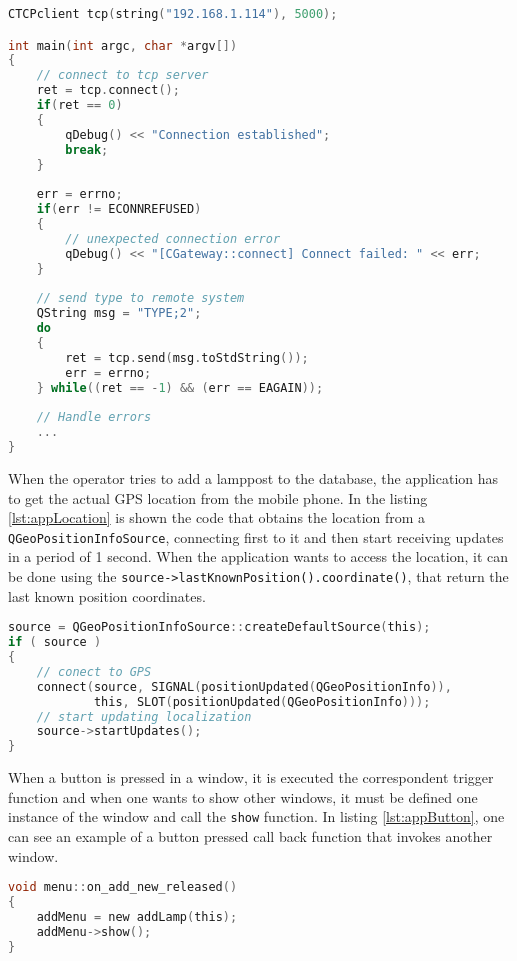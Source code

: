 \begin{lstlisting}[language=C, caption={Mobile Application: Connection to the server.}, label={lst:appConnection}]
CTCPclient tcp(string("192.168.1.114"), 5000);

int main(int argc, char *argv[])
{
	// connect to tcp server
	ret = tcp.connect();
	if(ret == 0)
	{
		qDebug() << "Connection established";
		break;
	}
	
	err = errno;
	if(err != ECONNREFUSED)
	{
		// unexpected connection error
		qDebug() << "[CGateway::connect] Connect failed: " << err;
	}
	
	// send type to remote system
	QString msg = "TYPE;2";	
	do
	{
		ret = tcp.send(msg.toStdString());
		err = errno;
	} while((ret == -1) && (err == EAGAIN));
	
	// Handle errors
	...
}
\end{lstlisting}

When the operator tries to add a lamppost to the database, the application has to get the actual GPS location from the mobile phone. In the listing \ref{lst:appLocation} is shown the code that obtains the location from a \verb|QGeoPositionInfoSource|, connecting first to it and then start receiving updates in a period of 1 second. When the application wants to access the location, it can be done using the \verb|source->lastKnownPosition().coordinate()|, that return the last known position coordinates.

\begin{lstlisting}[language=C, caption={Mobile Application: Obtain GPS coordinates.}, label={lst:appLocation}]
source = QGeoPositionInfoSource::createDefaultSource(this);
if ( source )
{
	// conect to GPS
	connect(source, SIGNAL(positionUpdated(QGeoPositionInfo)), 
			this, SLOT(positionUpdated(QGeoPositionInfo)));
	// start updating localization
	source->startUpdates();
}
\end{lstlisting}

When a button is pressed in a window, it is executed the correspondent trigger function and when one wants to show other windows, it must be defined one instance of the window and call the \verb|show| function. In listing \ref{lst:appButton}, one can see an example of a button pressed call back function that invokes another window.

\begin{lstlisting}[language=C, caption={Mobile Application: Button trigger function.}, label={lst:appButton}]
void menu::on_add_new_released()
{
	addMenu = new addLamp(this);
	addMenu->show();
}
\end{lstlisting}


